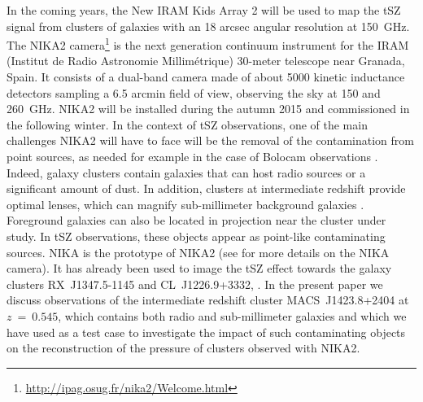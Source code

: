 \documentclass[twocolumn,traditabstract]{aa}
\begin{document}
In the coming years, the New IRAM Kids Array 2 \citep[NIKA2][]{monfardini2014} will be used to map the tSZ signal from clusters of galaxies with an 18 arcsec angular resolution at 150~GHz. The NIKA2 camera\footnote{\url{http://ipag.osug.fr/nika2/Welcome.html}} is the next generation continuum instrument for the IRAM (Institut de Radio Astronomie Millim\'etrique) 30-meter telescope near Granada, Spain. It consists of a dual-band camera made of about 5000 kinetic inductance detectors sampling a 6.5 arcmin field of view, observing the sky at 150 and 260~GHz. NIKA2 will be installed during the autumn 2015 and commissioned in the following winter. 
In the context of tSZ observations, one of the main challenges NIKA2 will have to face will be the removal of the contamination from point sources, as needed for example in the case of Bolocam observations \citep{sayers2013a}. Indeed, galaxy clusters contain galaxies that can host radio sources or a significant amount of dust. In addition, clusters at intermediate redshift provide optimal lenses, which can magnify sub-millimeter background galaxies \citep[see e.g.][]{adam2014}. Foreground galaxies can also be located in projection near the cluster under study. In tSZ observations, these objects appear as point-like contaminating sources. NIKA is the prototype of NIKA2 (see \citealt{monfardini2010,bourion2011,bourrion2012,monfardini2011,calvo2012,catalano2014} for more details on the NIKA camera). It has already been used to image the tSZ effect towards the galaxy clusters \mbox{RX~J1347.5-1145} and \mbox{CL~J1226.9+3332}, \citep[see][]{adam2013,adam2014}. In the present paper we discuss observations of  the intermediate redshift cluster \mbox{MACS~J1423.8+2404} at $z~=~0.545$, which contains both radio and sub-millimeter galaxies and which we have used as a test case to investigate the impact of such contaminating objects on the reconstruction of the pressure of clusters observed with NIKA2. 
\end{document}
